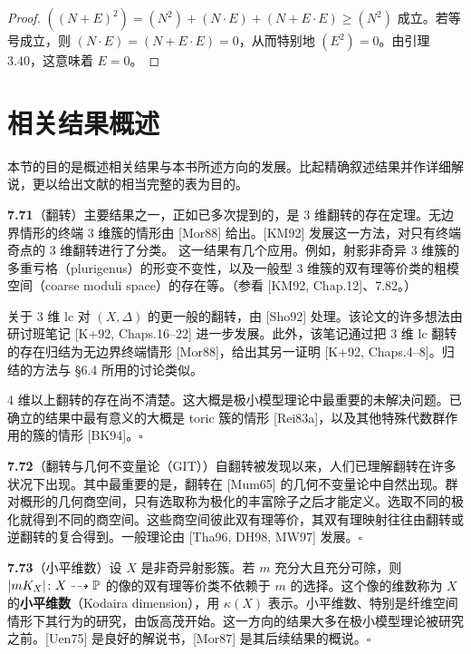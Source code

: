 \begin{proof}
$((N+E)^2)=(N^2)+(N\cdot E)+(N+E\cdot E)\ge(N^2)$ 成立。若等号成立，则 $(N\cdot E)=(N+E\cdot E)=0$，从而特别地 $(E^2)=0$。由引理 3.40，这意味着 $E=0$。
\end{proof}

\section{相关结果概述}

本节的目的是概述相关结果与本书所述方向的发展。比起精确叙述结果并作详细解说，更以给出文献的相当完整的表为目的。

\par\medskip\noindent\textbf{7.71}（翻转）\quad 主要结果之一，正如已多次提到的，是 3 维翻转的存在定理。无边界情形的终端 3 维簇的情形由 [Mor88] 给出。[KM92] 发展这一方法，对只有终端奇点的 3 维翻转进行了分类。
这一结果有几个应用。例如，射影非奇异 3 维簇的多重亏格（plurigenus）的形变不变性，以及一般型 3 维簇的双有理等价类的粗模空间（coarse moduli space）的存在等。（参看 [KM92, Chap.12]、7.82。）

关于 3 维 lc 对 $(X,\Delta)$ 的更一般的翻转，由 [Sho92] 处理。该论文的许多想法由研讨班笔记 [K+92, Chaps.16--22] 进一步发展。此外，该笔记通过把 3 维 lc 翻转的存在归结为无边界终端情形 [Mor88]，给出其另一证明 [K+92, Chaps.4--8]。归结的方法与 §6.4 所用的讨论类似。

4 维以上翻转的存在尚不清楚。这大概是极小模型理论中最重要的未解决问题。已确立的结果中最有意义的大概是 toric 簇的情形 [Rei83a]，以及其他特殊代数群作用的簇的情形 [BK94]。\hfill$\square$


\par\medskip\noindent\textbf{7.72}（翻转与几何不变量论（GIT））\quad 自翻转被发现以来，人们已理解翻转在许多状况下出现。其中最重要的是，翻转在 [Mum65] 的几何不变量论中自然出现。群对概形的几何商空间，只有选取称为极化的丰富除子之后才能定义。选取不同的极化就得到不同的商空间。这些商空间彼此双有理等价，其双有理映射往往由翻转或逆翻转的复合得到。一般理论由 [Tha96, DH98, MW97] 发展。\hfill$\square$

\par\medskip\noindent\textbf{7.73}（小平维数）\quad 设 $X$ 是非奇异射影簇。若 $m$ 充分大且充分可除，则 $|mK_X|\colon X\dashrightarrow\mathbb{P}$ 的像的双有理等价类不依赖于 $m$ 的选择。这个像的维数称为 $X$ 的\textbf{小平维数}（Kodaira dimension），用 $\kappa(X)$ 表示。小平维数、特别是纤维空间情形下其行为的研究，由饭高茂开始。这一方向的结果大多在极小模型理论被研究之前。[Uen75] 是良好的解说书，[Mor87] 是其后续结果的概说。\hfill$\square$

